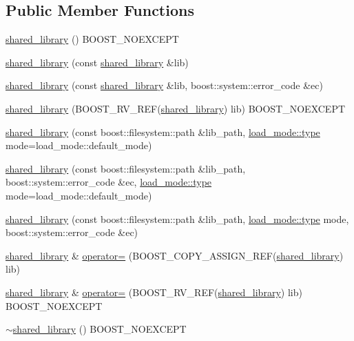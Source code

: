 \subsection*{Public Member Functions}
\begin{DoxyCompactItemize}
\item 
\hyperlink{a00271_a2ebb56c35c652538adac15f9e7042bc3}{shared\+\_\+library} () B\+O\+O\+S\+T\+\_\+\+N\+O\+E\+X\+C\+E\+PT
\item 
\hyperlink{a00271_a89eee45a2a309e7f4cfaba95873f30f8}{shared\+\_\+library} (const \hyperlink{a00271}{shared\+\_\+library} \&lib)
\item 
\hyperlink{a00271_a27f628687eb5d0a47d47f981d429ac33}{shared\+\_\+library} (const \hyperlink{a00271}{shared\+\_\+library} \&lib, boost\+::system\+::error\+\_\+code \&ec)
\item 
\hyperlink{a00271_a829033a804256cb41211865a6c056aff}{shared\+\_\+library} (B\+O\+O\+S\+T\+\_\+\+R\+V\+\_\+\+R\+EF(\hyperlink{a00271}{shared\+\_\+library}) lib) B\+O\+O\+S\+T\+\_\+\+N\+O\+E\+X\+C\+E\+PT
\item 
\hyperlink{a00271_afbfcc22b1a9089f474f05760c09a2261}{shared\+\_\+library} (const boost\+::filesystem\+::path \&lib\+\_\+path, \hyperlink{a00729_a1918a602801479bc0bade54ff5665129}{load\+\_\+mode\+::type} mode=load\+\_\+mode\+::default\+\_\+mode)
\item 
\hyperlink{a00271_a1827a294cc24c62c6fa06421be915690}{shared\+\_\+library} (const boost\+::filesystem\+::path \&lib\+\_\+path, boost\+::system\+::error\+\_\+code \&ec, \hyperlink{a00729_a1918a602801479bc0bade54ff5665129}{load\+\_\+mode\+::type} mode=load\+\_\+mode\+::default\+\_\+mode)
\item 
\hyperlink{a00271_ac5ca8102f3476173d70f101d07c8fb8d}{shared\+\_\+library} (const boost\+::filesystem\+::path \&lib\+\_\+path, \hyperlink{a00729_a1918a602801479bc0bade54ff5665129}{load\+\_\+mode\+::type} mode, boost\+::system\+::error\+\_\+code \&ec)
\item 
\hyperlink{a00271}{shared\+\_\+library} \& \hyperlink{a00271_a5f68b31fd48dcd4384cb4052af3a7df6}{operator=} (B\+O\+O\+S\+T\+\_\+\+C\+O\+P\+Y\+\_\+\+A\+S\+S\+I\+G\+N\+\_\+\+R\+EF(\hyperlink{a00271}{shared\+\_\+library}) lib)
\item 
\hyperlink{a00271}{shared\+\_\+library} \& \hyperlink{a00271_a174c64366a283023ca45b80ab27cdcfe}{operator=} (B\+O\+O\+S\+T\+\_\+\+R\+V\+\_\+\+R\+EF(\hyperlink{a00271}{shared\+\_\+library}) lib) B\+O\+O\+S\+T\+\_\+\+N\+O\+E\+X\+C\+E\+PT
\item 
\hyperlink{a00271_aa8df68945bd8598c3b873f622d6d2baa}{$\sim$shared\+\_\+library} () B\+O\+O\+S\+T\+\_\+\+N\+O\+E\+X\+C\+E\+PT

\end{DoxyCompactItemize}
